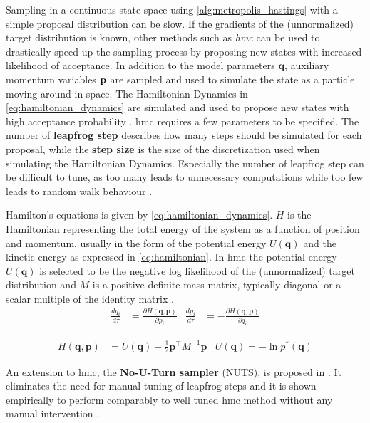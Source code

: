 Sampling in a continuous state-space using \cref{alg:metropolis_hastings} with a simple proposal distribution can be slow. If the gradients of the (unnormalized) target distribution is known, other methods such as \textit{\acrfull{hmc}} can be used to drastically speed up the sampling process by proposing new states with increased likelihood of acceptance. In addition to the model parameters $\mathbf{q}$, auxiliary momentum variables $\bf p$ are sampled and used to simulate the state as a particle moving around in space. The Hamiltonian Dynamics in \cref{eq:hamiltonian_dynamics} are simulated and used to propose new states with high acceptance probability \cite{neal2012mcmc,murphy,hoffman2011nouturn,robert2018accelerating}. \acrshort{hmc} requires a few parameters to be specified. The number of \textbf{leapfrog step} describes how many steps should be simulated for each proposal, while the \textbf{step size} is the size of the discretization used when simulating the Hamiltonian Dynamics. Especially the number of leapfrog step can be difficult to tune, as too many leads to unnecessary computations while too few leads to random walk behaviour \cite{hoffman2011nouturn}. 

Hamilton's equations is given by \cref{eq:hamiltonian_dynamics}. $H$ is the Hamiltonian representing the total energy of the system as a function of position and momentum, usually in the form of the potential energy $U(\mathbf{q})$ and the kinetic energy as expressed in \cref{eq:hamiltonian}. In \acrshort{hmc} the potential energy $U(\mathbf{q})$ is selected to be the negative log likelihood of the (unnormalized) target distribution and $M$ is a positive definite mass matrix, typically diagonal or a scalar multiple of the identity matrix \cite{neal2012mcmc}. 
\begin{align}\label{eq:hamiltonian_dynamics}
    \frac{d q_i}{d\tau} &= \frac{\partial H(\mathbf{q}, \mathbf{p})}{\partial p_i} & \frac{d p_i}{d\tau} &= -\frac{\partial H(\mathbf{q}, \mathbf{p})}{\partial q_i}
\end{align}

\begin{align}\label{eq:hamiltonian}
    H(\mathbf{q}, \mathbf{p}) &= U(\mathbf{q}) + \frac{1}{2} \mathbf{p}^\intercal M^{-1} \mathbf{p} & U(\mathbf{q}) = - \ln p^*(\mathbf{q})
\end{align}

An extension to \acrshort{hmc}, the \textbf{No-U-Turn sampler} (NUTS), is proposed in \cite{hoffman2011nouturn}. It eliminates the need for manual tuning of leapfrog steps and it is shown empirically to perform comparably to well tuned \acrshort{hmc} method without any manual intervention \cite{hoffman2011nouturn}.



